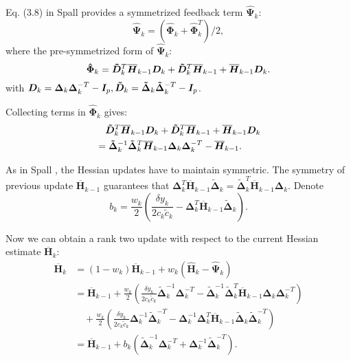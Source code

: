 \documentclass[conference]{IEEEtran} \ifCLASSINFOpdf
\newcommand{\bI}{\bm{I}} \newcommand{\bDelta}{\bm{\Delta}}
\newcommand{\oH}{\bm{\overline{H}}}
\newcommand{\hH}{\bm{\hat{H}}} \newcommand{\hPsi}{\bm{\hat{\Psi}}}
\newcommand{\hPhi}{\bm{\hat{\Phi}}}
\newcommand{\tDelta}{\bm{\tilde{\Delta}}}
\newcommand{\tD}{\bm{\tilde{D}}} \newcommand{\remove}[1]{}
\begin{document}
Eq. (3.8) in Spall \cite{Spall2009} provides a symmetrized
feedback term $ \hPsi_k $:
\begin{equation} \label{eq:PsiHat} \hPsi_k
  =(\hPhi_k+\hPhi_k^T)/2,
\end{equation} where the pre-symmetrized form of $ \hPsi_k $:
\begin{equation}
  \hPhi_k=\tD_k^T\oH_{k-1}\bD_k+\tD_k^T\oH_{k-1}+\oH_{k-1}\bD_k.
\end{equation} with $ \bD_k=\bDelta_k\bDelta_k^{-T}-\bI_p,
\tD_k=\tDelta_k\tDelta_k^{-T}-\bI_p $.

Collecting terms in $\hPhi_k$ gives:
\begin{align*}
  &\quad\tD_k^T\oH_{k-1}\bD_k+\tD_k^T\oH_{k-1}+\oH_{k-1}\bD_k\\
  &=\tDelta_k^{-1}\tDelta_k^{T}\oH_{k-1}\bDelta_k\bDelta_k^{-T}-\oH_{k-1}.
\end{align*}

As in Spall \cite{Spall2009}, the Hessian updates have to
maintain symmetric. The symmetry of previous update $ \oH_{k-1}$
guarantees that
$\bDelta_k^{T}\oH_{k-1}\tDelta_k=\tDelta_k^{T}\oH_{k-1}\bDelta_k$. Denote
\begin{equation}
  b_k=\frac{w_k}{2}(\frac{\delta y_k}{2c_k\tilde{c}_k}-\bDelta_k^{T}\oH_{k-1}\tDelta_k).
\end{equation}


Now we can obtain a rank two update with respect to the
current Hessian estimate $\oH_k$:
\begin{align*}
\oH_k&=(1-w_k)\oH_{k-1}+w_k(\hH_k-\hPsi_k)\\
     &=\oH_{k-1}+\frac{w_k}{2}(\frac{\delta y_k}{2c_k\tilde{c}_k}\tDelta_k^{-1}\bDelta_k^{-T}-\tDelta_k^{-1}\tDelta_k^{T}\oH_{k-1}\bDelta_k\bDelta_k^{-T})\\
     &\quad +\frac{w_k}{2}(\frac{\delta y_k}{2c_k\tilde{c}_k}\bDelta_k^{-1}\tDelta_k^{-T}-\bDelta_k^{-1}\bDelta_k^{T}\oH_{k-1}\tDelta_k\tDelta_k^{-T})\\
     &=\oH_{k-1}+b_k(\tDelta_k^{-1}\bDelta_k^{-T}+\bDelta_k^{-1}\tDelta_k^{-T}).
\end{align*}
\end{document}
